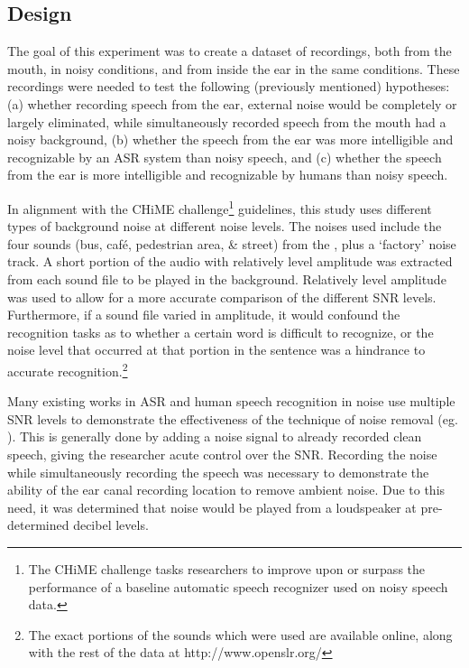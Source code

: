 \subsection{Design}
\label{chap2:methods:design}
   
The goal of this experiment was to create a dataset of recordings, both from the mouth, in noisy conditions, and from inside the ear in the same conditions.  These recordings were needed to test the following (previously mentioned) hypotheses: (a) whether recording speech from the ear, external noise would be completely or largely eliminated, while simultaneously recorded speech from the mouth had a noisy background, (b) whether the speech from the ear was more intelligible and recognizable by an ASR system than noisy speech, and (c) whether the speech from the ear is more intelligible and recognizable by humans than noisy speech. 

In alignment with the CHiME challenge\footnote{The CHiME challenge tasks researchers to improve upon or surpass the performance of a baseline automatic speech recognizer used on noisy speech data.} guidelines, this study uses different types of background noise at different noise levels.  The noises used include the four sounds (bus, caf\'{e}, pedestrian area, \& street) from the \cite{chime:16}, plus a `factory' noise track.  A short portion of the audio with relatively level amplitude was extracted from each sound file to be played in the background.  Relatively level amplitude was used to allow for a more accurate comparison of the different SNR levels. Furthermore, if a sound file varied in amplitude, it would confound the recognition tasks as to whether a certain word is difficult to recognize, or the noise level that occurred at that portion in the sentence was a hindrance to accurate recognition.\footnote{The exact portions of the sounds which were used are available online, along with the rest of the data at http://www.openslr.org/}

Many existing works in ASR and human speech recognition in noise use multiple SNR levels to demonstrate the effectiveness of the technique of noise removal (eg. \cite{braun:16}).  This is generally done by adding a noise signal to already recorded clean speech, giving the researcher acute control over the SNR.  Recording the noise while simultaneously recording the speech was necessary to demonstrate the ability of the ear canal recording location to remove ambient noise.  Due to this need, it was determined that noise would be played from a loudspeaker at pre-determined decibel levels.  

